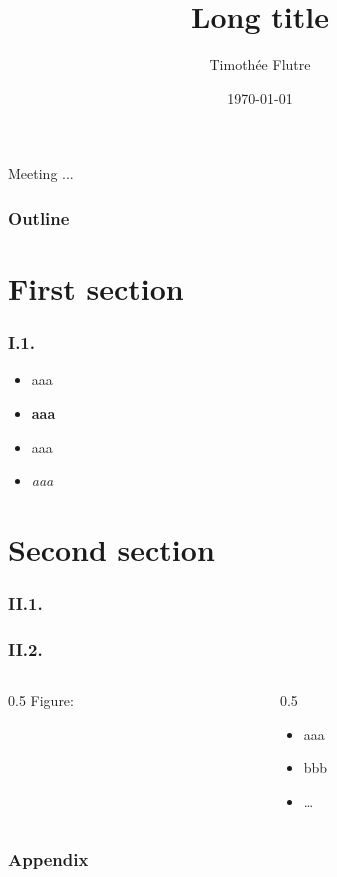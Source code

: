 \documentclass[c]{beamer} %
\title[Short title]{Long title}
\author[T. Flutre]{Timothée Flutre}
\institute[Short affiliation]{Long affiliation}
\date{\today}
\begin{document}
\begin{frame}
  \footnotesize
  \begin{center}
    Meeting ...
  \end{center}
  \normalsize

  \bigskip
  
  \titlepage
\end{frame}

\begin{frame}
  \frametitle{Outline}
  \tableofcontents
\end{frame}

\section{First section}

\begin{frame}
  \frametitle{I.1.}
  \begin{itemize}
  \item aaa
  \item \textbf{aaa}
  \item \alert{aaa}
  \item \emph{aaa}
  \end{itemize}
\end{frame}

\section{Second section}

\begin{frame}
  \frametitle{II.1.}
  \begin{center}
  \end{center}
\end{frame}

\begin{frame}
  \frametitle{II.2.}
  \begin{columns}
    \begin{column}{0.5\textwidth}
      Figure:
      \begin{center}
      \end{center}
    \end{column}
    \begin{column}{0.5\textwidth}
      \begin{itemize}
      \item aaa
      \item bbb
      \item \dots
      \end{itemize}
    \end{column}
  \end{columns}
\end{frame}

\appendix
{}
\setcounter{finalframe}{\value{framenumber}}

\begin{frame}
  \frametitle{Appendix}
\end{frame}

\setcounter{framenumber}{\value{finalframe}}
\end{document}
